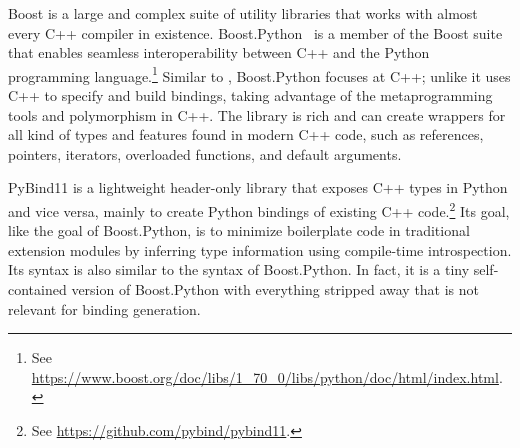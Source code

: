 Boost is a large and complex suite of utility libraries that works with almost every C++ compiler in existence. Boost.Python~\cite{bhsbp-ag-03} is a member of the Boost suite that enables seamless interoperability between C++ and the Python programming language.\footnote{See   \url{https://www.boost.org/doc/libs/1_70_0/libs/python/doc/html/index.html}.} Similar to , Boost.Python focuses at C++; unlike  it uses C++ to specify and build bindings, taking advantage of the metaprogramming tools and polymorphism in C++. The library is rich and can create wrappers for all kind of types and features found in modern C++ code, such as references, pointers, iterators, overloaded functions, and default arguments.


PyBind11 is a lightweight header-only library that exposes C++ types in Python and vice versa, mainly to create Python bindings of existing C++ code.\footnote{See \url{https://github.com/pybind/pybind11}.} Its goal, like the goal of Boost.Python, is to minimize boilerplate code in traditional extension modules by inferring type information using compile-time introspection. Its syntax is also similar to the syntax of Boost.Python. In fact, it is a tiny self-contained version of Boost.Python with everything stripped away that is not relevant for binding generation.

